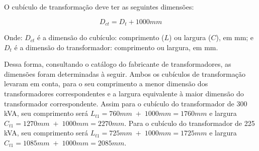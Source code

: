 O cubículo de transformação deve ter as seguintes dimensões:

\begin{equation}
    D_{ct} = D_t + 1000mm
\end{equation}

Onde: $D_{ct}$ é a dimensão do cubículo: comprimento ($L$) ou largura ($C$), em mm; e $D_t$ é a dimensão do transformador: comprimento ou largura, em mm.

Dessa forma, consultando o catálogo do fabricante de transformadores, as dimensões foram determinadas à seguir. Ambos os cubículos de transformação levaram em conta, para o seu comprimento a menor dimensão dos transformadores correspondentes e a largura equivalente à maior dimensão do transformador correspondente. Assim para o cubículo do transformador de 300 kVA, seu comprimento será $L_{t1} = 760mm \;+\; 1000mm = 1760mm$ e largura $C_{t1} = 1270mm \;+\; 1000mm = 2270mm$. Para o cubículo do transformador de 225 kVA, seu comprimento será $L_{t1} = 725mm \;+\; 1000mm = 1725mm$ e largura $C_{t1} = 1085mm \;+\; 1000mm = 2085mm$.
